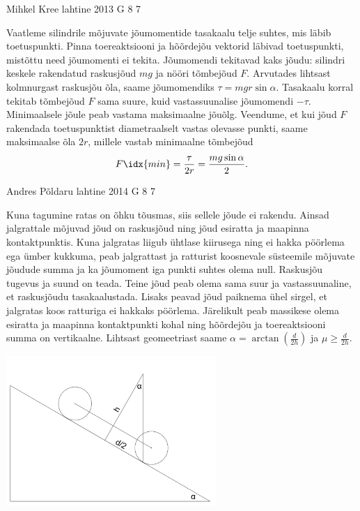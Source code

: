 \documentclass[11pt, twoside]{article}
\begin{document}
{%
{Mihkel Kree} %
{lahtine} %
{2013} %
{G 8} %
{7} %
{

\ifSolution
Vaatleme silindrile mõjuvate jõumomentide tasakaalu telje suhtes, mis läbib toetuspunkti. Pinna toereaktsiooni ja hõõrdejõu vektorid läbivad toetuspunkti, mistõttu need jõumomenti ei tekita. Jõumomendi tekitavad kaks jõudu: silindri keskele rakendatud raskusjõud $mg$ ja nööri tõmbejõud $F$. Arvutades lihtsast kolmnurgast raskusjõu õla, saame jõumomendiks $\tau=mgr\sin\alpha$. Tasakaalu korral tekitab tõmbejõud $F$ sama suure, kuid vastassuunalise jõumomendi $-\tau$. Minimaalsele jõule peab vastama maksimaalne jõuõlg. Veendume, et kui jõud $F$ rakendada toetuspunktist diametraalselt vastas olevasse punkti, saame maksimaalse õla $2r$, millele vastab minimaalne tõmbejõud
\[F\idx{min}=\frac{\tau}{2r}=\frac{mg\sin\alpha}{2}.\]
\fi
}

{Andres Põldaru} %
{lahtine} %
{2014} %
{G 8} %
{7} %
{

\ifSolution
Kuna tagumine ratas on õhku tõusmas, siis sellele jõude ei rakendu. Ainsad jalgrattale mõjuvad jõud on raskusjõud ning jõud esiratta ja maapinna kontaktpunktis. Kuna jalgratas liigub ühtlase kiirusega ning ei hakka pöörlema ega ümber kukkuma, peab jalgrattast ja ratturist koosnevale süsteemile mõjuvate jõudude summa ja ka jõumoment iga punkti suhtes olema null. Raskusjõu tugevus ja suund on teada. Teine jõud peab olema sama suur ja vastassuunaline, et raskusjõudu tasakaalustada. Lisaks peavad jõud paiknema ühel sirgel, et jalgratas koos ratturiga ei hakkaks pöörlema. Järelikult peab massikese olema esiratta ja maapinna kontaktpunkti kohal ning hõõrdejõu ja toereaktsiooni summa on vertikaalne. Lihtsast geomeetriast saame $\alpha=\arctan(\frac{d}{2h})$ ja $\mu\ge\frac{d}{2h}$.
\begin{center}
\includegraphics[width=0.6\textwidth]{2014-lahg-08-ratas}
\end{center}
\fi
}

}
\end{document}
